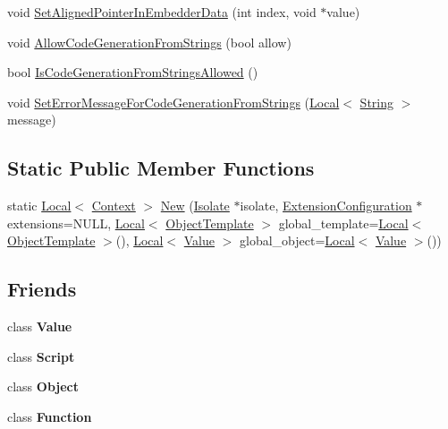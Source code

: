 \begin{DoxyCompactItemize}
void \hyperlink{classv8_1_1Context_a522063c88e4c2832f5ff4f3980815f58}{Set\+Aligned\+Pointer\+In\+Embedder\+Data} (int index, void $\ast$value)
\item 
void \hyperlink{classv8_1_1Context_a794ccc42113566f5d363f89c8b0d3c2c}{Allow\+Code\+Generation\+From\+Strings} (bool allow)
\item 
bool \hyperlink{classv8_1_1Context_aa7a960a232d232d1a2a904c2e6c18831}{Is\+Code\+Generation\+From\+Strings\+Allowed} ()
\item 
void \hyperlink{classv8_1_1Context_a8c919ccddb6fbb65602f7fe2587e8a34}{Set\+Error\+Message\+For\+Code\+Generation\+From\+Strings} (\hyperlink{classv8_1_1Local}{Local}$<$ \hyperlink{classv8_1_1String}{String} $>$ message)
\end{DoxyCompactItemize}
\subsection*{Static Public Member Functions}
\begin{DoxyCompactItemize}
\item 
static \hyperlink{classv8_1_1Local}{Local}$<$ \hyperlink{classv8_1_1Context}{Context} $>$ \hyperlink{classv8_1_1Context_aee22d1422b0804b5b6bc0646bfd29af8}{New} (\hyperlink{classv8_1_1Isolate}{Isolate} $\ast$isolate, \hyperlink{classv8_1_1ExtensionConfiguration}{Extension\+Configuration} $\ast$extensions=N\+U\+L\+L, \hyperlink{classv8_1_1Local}{Local}$<$ \hyperlink{classv8_1_1ObjectTemplate}{Object\+Template} $>$ global\+\_\+template=\hyperlink{classv8_1_1Local}{Local}$<$ \hyperlink{classv8_1_1ObjectTemplate}{Object\+Template} $>$(), \hyperlink{classv8_1_1Local}{Local}$<$ \hyperlink{classv8_1_1Value}{Value} $>$ global\+\_\+object=\hyperlink{classv8_1_1Local}{Local}$<$ \hyperlink{classv8_1_1Value}{Value} $>$())
\end{DoxyCompactItemize}
\subsection*{Friends}
\begin{DoxyCompactItemize}
\item 
\hypertarget{classv8_1_1Context_aeceedf6e1a7d48a588516ce2b1983d6f}{}class {\bfseries Value}\label{classv8_1_1Context_aeceedf6e1a7d48a588516ce2b1983d6f}

\item 
\hypertarget{classv8_1_1Context_ae98eaa96d1b24e087f3c3e372fb09dce}{}class {\bfseries Script}\label{classv8_1_1Context_ae98eaa96d1b24e087f3c3e372fb09dce}

\item 
\hypertarget{classv8_1_1Context_a0720b5f434e636e22a3ed34f847eec57}{}class {\bfseries Object}\label{classv8_1_1Context_a0720b5f434e636e22a3ed34f847eec57}

\item 
\hypertarget{classv8_1_1Context_ab7194606aa12931e96f8f5448d418ed0}{}class {\bfseries Function}\label{classv8_1_1Context_ab7194606aa12931e96f8f5448d418ed0}

\end{DoxyCompactItemize}


